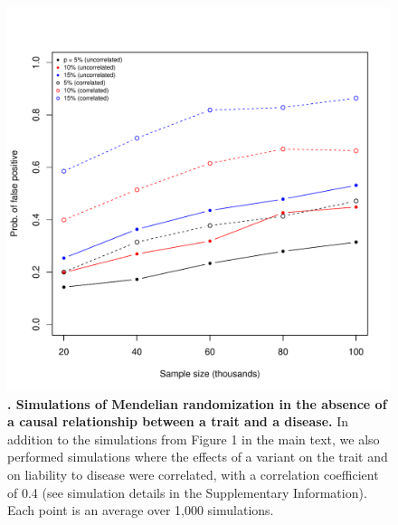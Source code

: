 \documentclass[11pt,titlepage]{article}
\begin{document}
\begin{figure}
\begin{center}
\includegraphics[scale = 0.5]{wcor.pdf}
\caption{ \textbf{. Simulations of Mendelian randomization in the absence of a causal relationship between a trait and a disease.} In addition to the simulations from Figure 1 in the main text, we also performed simulations where the effects of a variant on the trait and on liability to disease were correlated, with a correlation coefficient of 0.4 (see simulation details in the Supplementary Information). Each point is an average over 1,000 simulations.}\label{f_sim}
\end{center}
\end{figure}
\clearpage

\end{document}
